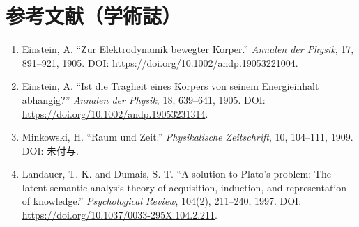 \section*{参考文献（学術誌）}
\begin{enumerate}[leftmargin=2.4em]
\item Einstein, A. ``Zur Elektrodynamik bewegter Korper.'' \textit{Annalen der Physik}, 17, 891--921, 1905. DOI: \url{https://doi.org/10.1002/andp.19053221004}.
\item Einstein, A. ``Ist die Tragheit eines Korpers von seinem Energieinhalt abhangig?'' \textit{Annalen der Physik}, 18, 639--641, 1905. DOI: \url{https://doi.org/10.1002/andp.19053231314}.
\item Minkowski, H. ``Raum und Zeit.'' \textit{Physikalische Zeitschrift}, 10, 104--111, 1909. DOI: 未付与.
\item Landauer, T. K. and Dumais, S. T. ``A solution to Plato's problem: The latent semantic analysis theory of acquisition, induction, and representation of knowledge.'' \textit{Psychological Review}, 104(2), 211--240, 1997. DOI: \url{https://doi.org/10.1037/0033-295X.104.2.211}.
\end{enumerate}

